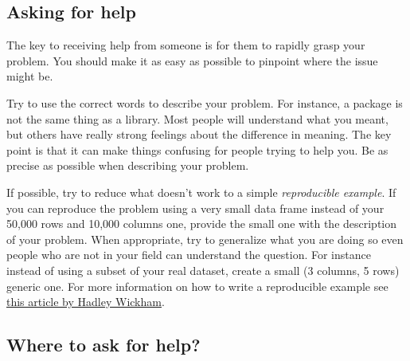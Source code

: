 \documentclass[
]{book}
\begin{document}
\hypertarget{asking-for-help}{%
\subsection*{Asking for help}\label{asking-for-help}}

The key to receiving help from someone is for them to rapidly grasp your problem. You should make it as easy as possible to pinpoint where the issue might be.

Try to use the correct words to describe your problem. For instance, a package is not the same thing as a library. Most people will understand what you meant, but others have really strong feelings about the difference in meaning. The key point is that it can make things confusing for people trying to help you. Be as precise as possible when describing your problem.

If possible, try to reduce what doesn't work to a simple \emph{reproducible example}. If you can reproduce the problem using a very small data frame instead of your 50,000 rows and 10,000 columns one, provide the small one with the description of your problem. When appropriate, try to generalize what you are doing so even people who are not in your field can understand the question. For instance instead of using a subset of your real dataset, create a small (3 columns, 5 rows) generic one. For more information on how to write a reproducible example see \href{\%22http://adv-r.had.co.nz/Reproducibility.html\%22}{this article by Hadley Wickham}.

\hypertarget{where-to-ask-for-help}{%
\subsection*{Where to ask for help?}\label{where-to-ask-for-help}}
\end{document}
